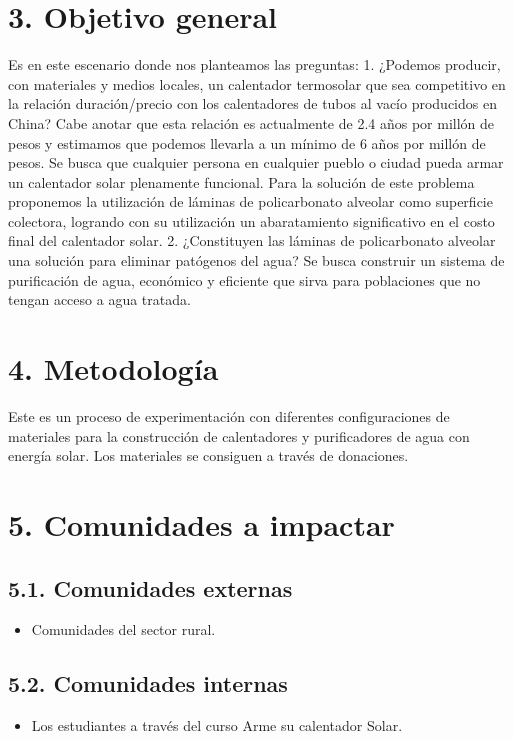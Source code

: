 \documentclass[a4paper,12pt]{article}
\begin{document}
\section*{3. Objetivo general}
Es en este escenario donde nos planteamos las preguntas: 1. ¿Podemos producir, con materiales y medios locales, un calentador termosolar que sea competitivo en la relación duración/precio con los calentadores de tubos al vacío producidos en China? Cabe anotar que esta relación es actualmente de 2.4 años por millón de pesos y estimamos que podemos llevarla a un mínimo de 6 años por millón de pesos. Se busca que cualquier persona en cualquier pueblo o ciudad pueda armar un calentador solar plenamente funcional. Para la solución de este problema proponemos la utilización de láminas de policarbonato alveolar como superficie colectora, logrando con su utilización un abaratamiento significativo en el costo final del calentador solar. 2. ¿Constituyen las láminas de policarbonato alveolar una solución para eliminar patógenos del agua? Se busca construir un sistema de purificación de agua, económico y eficiente que sirva para poblaciones que no tengan acceso a agua tratada.

\section*{4. Metodología}
Este es un proceso de experimentación con diferentes configuraciones de materiales para la construcción de calentadores y purificadores de agua con energía solar. Los materiales se consiguen a través de donaciones.

\section*{5. Comunidades a impactar}
\subsection*{5.1. Comunidades externas}
\begin{itemize}
    \item Comunidades del sector rural.
\end{itemize}

\subsection*{5.2. Comunidades internas}
\begin{itemize}
    \item Los estudiantes a través del curso Arme su calentador Solar.
\end{itemize}
\end{document}

